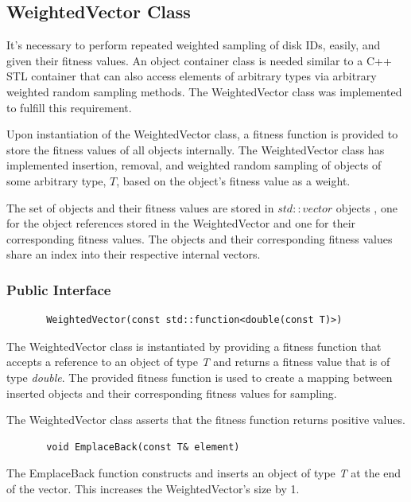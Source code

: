 \documentclass[12pt]{article}
\begin{document}
  \subsection{WeightedVector Class}

  It's necessary to perform repeated weighted sampling of disk IDs, easily, and
  given their fitness values. An object container class is needed similar to a
  C++ STL container \cite{stl} that can also access elements of arbitrary
  types via arbitrary weighted random sampling methods. The WeightedVector
  class was implemented to fulfill this requirement. 

  Upon instantiation of the WeightedVector class, a fitness function is
  provided to store the fitness values of all objects internally. The
  WeightedVector class has implemented insertion, removal, and weighted random
  sampling of objects of some arbitrary type, $T$, based on the object's
  fitness value as a weight.

  The set of objects and their fitness values are stored in $std::vector$
  objects , one for the object references stored in the WeightedVector and one
  for their corresponding fitness values. The objects and their corresponding
  fitness values share an index into their respective internal vectors.

    \subsubsection{Public Interface}

     \begin{verbatim}
       WeightedVector(const std::function<double(const T)>)
     \end{verbatim}

     The WeightedVector class is instantiated by providing a fitness function
     that accepts a reference to an object of type \emph{T} and returns a
     fitness value that is of type \emph{double}. The provided fitness function
     is used to create a mapping between inserted objects and their
     corresponding fitness values for sampling.

     The WeightedVector class asserts that the fitness function returns positive
     values.

     \begin{verbatim}
       void EmplaceBack(const T& element)
     \end{verbatim}

     The EmplaceBack function constructs and inserts an object of type
     \emph{T} at the end of the vector. This increases the WeightedVector's
     size by 1.
\end{document}
